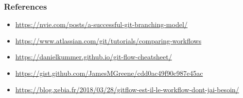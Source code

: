 \documentclass{beamer}
\begin{document}
\begin{frame}
\frametitle{References} %

\begin{itemize}
    \item \url{https://nvie.com/posts/a-successful-git-branching-model/}
    \item \url{https://www.atlassian.com/git/tutorials/comparing-workflows}
    \item \url{https://danielkummer.github.io/git-flow-cheatsheet/}
    \item \url{https://gist.github.com/JamesMGreene/cdd0ac49f90c987e45ac}
    \item \url{https://blog.xebia.fr/2018/03/28/gitflow-est-il-le-workflow-dont-jai-besoin/}
\end{itemize}

\end{frame}
\end{document}
